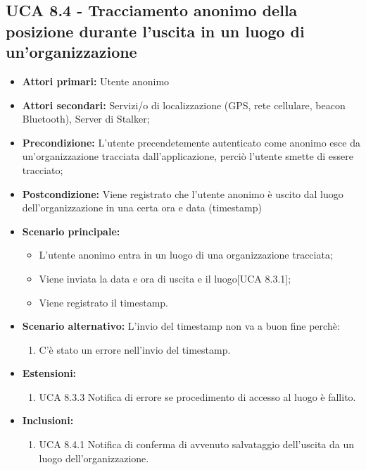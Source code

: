 \subsection{UCA 8.4 - Tracciamento anonimo della posizione durante l'uscita in un luogo di un'organizzazione}%
\begin{itemize}
	\item \textbf{Attori primari:} Utente anonimo 
	\item \textbf{Attori secondari:} Servizi/o di localizzazione (GPS, rete cellulare, beacon Bluetooth), Server di Stalker;
	\item \textbf{Precondizione:} L'utente precendetemente autenticato come anonimo esce da un'organizzazione tracciata dall'applicazione, perciò l'utente smette di essere tracciato;
\item \textbf{Postcondizione:} Viene registrato che l'utente anonimo è uscito dal luogo dell'organizzazione in una certa ora e data (timestamp)
\item \textbf{Scenario principale:}
\begin{itemize}
	\item L'utente anonimo entra in un luogo di una organizzazione tracciata;
	\item Viene inviata la data e ora di uscita e il luogo[UCA 8.3.1];
	\item Viene registrato il timestamp.
\end{itemize}
\item \textbf{Scenario alternativo:} L'invio del timestamp non va a buon fine perchè:
\begin{enumerate}
	\item C'è stato un errore nell'invio del timestamp.
\end{enumerate}
\item \textbf{Estensioni:}
\begin{enumerate}
	\item UCA 8.3.3 Notifica di errore se procedimento di accesso al luogo è fallito.
\end{enumerate}
\item \textbf{Inclusioni:}
\begin{enumerate}
	\item UCA 8.4.1 Notifica di conferma di avvenuto salvataggio dell'uscita da un luogo dell'organizzazione.
\end{enumerate}
\end{itemize}

